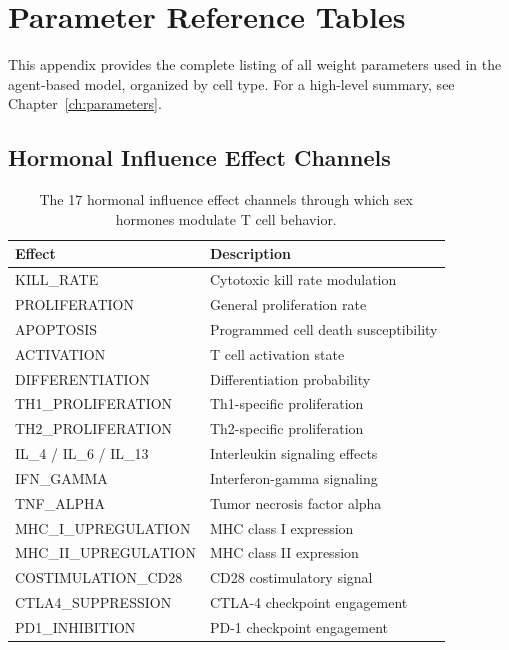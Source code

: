 \chapter{Parameter Reference Tables}
\label{ch:appendix-params}

This appendix provides the complete listing of all weight parameters used in the agent-based model, organized by cell type. For a high-level summary, see Chapter~\ref{ch:parameters}.

\section*{Hormonal Influence Effect Channels}

\begin{table}[htbp]
\centering
\caption{The 17 hormonal influence effect channels through which sex hormones modulate T cell behavior.}
\label{tab:hormonal-effects}
{\scriptsize
\begin{tabular}{@{}ll@{}}
\toprule
\textbf{Effect} & \textbf{Description} \\
\midrule
KILL\_RATE            & Cytotoxic kill rate modulation \\
PROLIFERATION         & General proliferation rate \\
APOPTOSIS             & Programmed cell death susceptibility \\
ACTIVATION            & T cell activation state \\
DIFFERENTIATION       & Differentiation probability \\
TH1\_PROLIFERATION    & Th1-specific proliferation \\
TH2\_PROLIFERATION    & Th2-specific proliferation \\
IL\_4 / IL\_6 / IL\_13 & Interleukin signaling effects \\
IFN\_GAMMA            & Interferon-gamma signaling \\
TNF\_ALPHA            & Tumor necrosis factor alpha \\
MHC\_I\_UPREGULATION  & MHC class I expression \\
MHC\_II\_UPREGULATION & MHC class II expression \\
COSTIMULATION\_CD28   & CD28 costimulatory signal \\
CTLA4\_SUPPRESSION    & CTLA-4 checkpoint engagement \\
PD1\_INHIBITION       & PD-1 checkpoint engagement \\
\bottomrule
\end{tabular}
}
\end{table}

